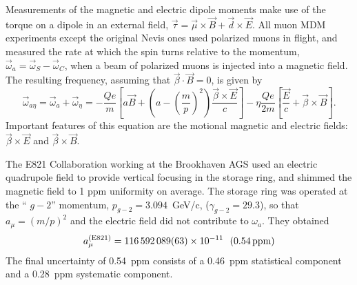







Measurements of the magnetic and electric dipole moments make use of the
torque on a dipole in an external field, $\vec \tau = \vec\mu \times
\vec B + \vec d \times \vec E$. All muon MDM experiments except the original
Nevis ones used polarized muons in flight, and
 measured the rate at which the spin turns relative to the momentum,
$\vec \omega_a =\vec \omega_S - \vec \omega_C$, when a
 beam of polarized muons is injected into a magnetic field.
The resulting frequency, assuming that $\vec \beta \cdot \vec B = 0$,
 is given
by~\cite{Thomas26,Bargmann59}
\begin{equation}
\vec{\omega}_{a\eta}= \vec \omega_a + \vec \omega_\eta = -
 \frac {Qe}  {m}
\left[
a \vec{B}
+ \left( a - \left(  \frac {m} {p} \right)^2  \right)
 \frac {\vec{\beta} \times \vec{E}} {c} \right] -  \eta \frac {Qe}{2m}
 \left[ \frac {\vec{E}} {c}  +  \vec{\beta} \times \vec{B} \right] .
 \label{eq:omegaa-edm1}
\end{equation}
Important features of this equation are the motional magnetic and
electric fields:
$\vec \beta \times \vec E$ and $\vec \beta \times \vec B$.


The E821 Collaboration working at the
Brookhaven AGS used an electric quadrupole field
to provide vertical focusing in the storage ring, and shimmed the magnetic
field to 1 ppm uniformity on average.  The storage ring was operated
 at the `` $g-2$'' momentum, $p_{ g-2} = 3.094$~GeV/c,
($\gamma_{ g-2}= 29.3$),
so that $a_\mu = (m/p)^2$ and the electric field did not
contribute to $\omega_a$.
They obtained\cite{Bennett06}
\begin{equation}
  a_\mu^{(\mathrm{E821})} = 116\,592\,089(63) \times
  10^{-11}~~\mbox{(0.54\,ppm)}
\end{equation}
 The final uncertainty of
0.54~ppm consists of a 0.46~ppm statistical component and a 0.28~ppm
systematic
component.  

